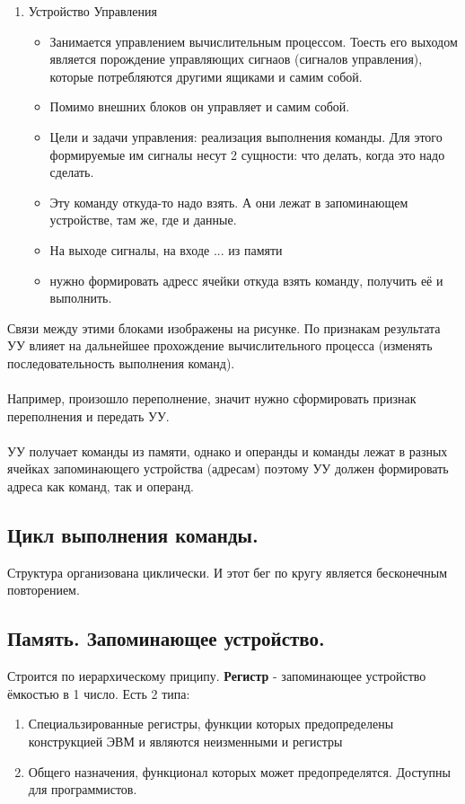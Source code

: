 \documentclass[12px]{article}
\begin{document}
\begin{enumerate}
    \item Устройство Управления
    \begin{itemize}
        \item Занимается управлением вычислительным процессом. Тоесть его выходом является порождение управляющих сигнаов (сигналов управления), которые потребляются другими ящиками и самим собой. 
        \item Помимо внешних блоков он управляет и самим собой.
        \item Цели и задачи управления: реализация выполнения команды. Для этого формируемые им сигналы несут 2 сущности: что делать, когда это надо сделать.
        \item Эту команду откуда-то надо взять. А они лежат в запоминающем устройстве, там же, где и данные. 
        \item На выходе сигналы, на входе ... из памяти
        \item нужно формировать адресс ячейки откуда взять команду, получить её и выполнить.
    \end{itemize}
\end{enumerate}
Связи между этими блоками изображены на рисунке.
По признакам результата УУ влияет на дальнейшее прохождение вычислительного процесса (изменять последовательность выполнения команд).\\\\
Например, произошло переполнение, значит нужно сформировать признак переполнения и передать УУ.\\\\
УУ получает команды из памяти, однако и операнды и команды лежат в разных ячейках запоминающего устройства (адресам) поэтому УУ должен формировать адреса как команд, так и операнд.
\subsection{Цикл выполнения команды.}
Структура организована циклически. И этот бег по кругу является бесконечным повторением. \\

\subsection{Память. Запоминающее устройство.}
Строится по иерархическому приципу.
\textbf{Регистр} - запоминающее устройство ёмкостью в 1 число. Есть 2 типа:
\begin{enumerate}
    \item Специальзированные регистры, функции которых предопределены конструкцией ЭВМ и являются неизменными и регистры 
    \item Общего назначения, функционал которых может предопределятся. Доступны для программистов.
\end{enumerate}
\end{document}
